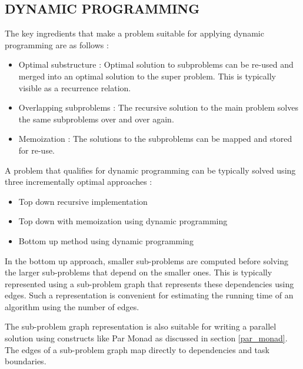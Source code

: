 \documentclass[12pt,a4paper]{article}
\begin{document}
	\subsection{DYNAMIC PROGRAMMING}
	\indent \par The key ingredients that make a problem suitable for applying dynamic programming are as follows \cite{cormen} :
	\begin{itemize}
	\item Optimal substructure : Optimal solution to subproblems can be re-used and merged into an optimal solution to the super problem. This is typically visible as a recurrence relation.
	\item Overlapping subproblems : The recursive solution to the main problem solves the same subproblems over and over again.
	\item Memoization : The solutions to the subproblems can be mapped and stored for re-use.
	\end{itemize}
	
	\par A problem that qualifies for dynamic programming can be typically solved using three incrementally optimal approaches \cite{cormen}:
	\begin{itemize}
	\item Top down recursive implementation
	\item Top down with memoization using dynamic programming
	\item Bottom up method using dynamic programming
	\end{itemize}
	\par In the bottom up approach, smaller sub-problems are computed before solving the larger sub-problems that depend on the smaller ones. This is typically represented using a sub-problem graph that represents these dependencies using edges. Such a representation is convenient for estimating the running time of an algorithm using the number of edges.
	\par The sub-problem graph representation is also suitable for writing a parallel solution using constructs like Par Monad as discussed in section \ref{par_monad}. The edges of a sub-problem graph map directly to dependencies and task boundaries.
\end{document}
